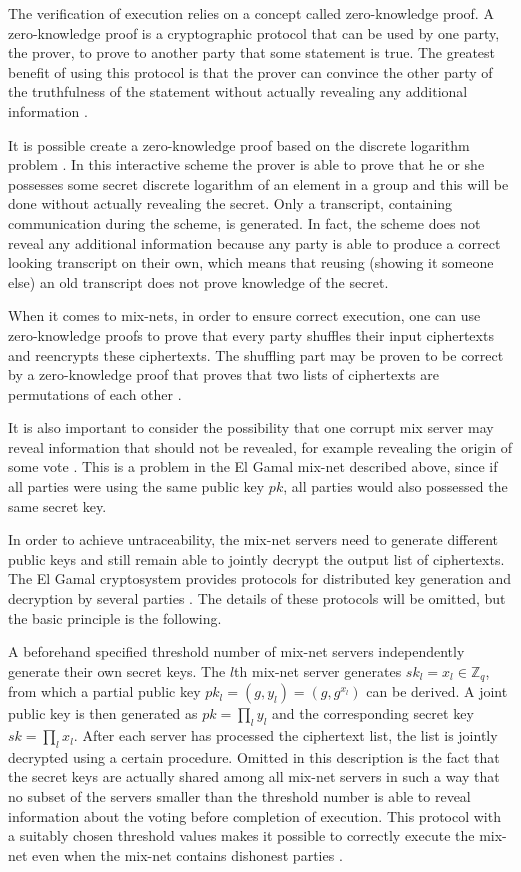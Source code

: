 The verification of execution relies on a concept called
zero-knowledge proof. A zero-knowledge proof is a cryptographic
protocol that can be used by one party, the prover, to prove to
another party that some statement is true. The greatest benefit of
using this protocol is that the prover can convince the other party of
the truthfulness of the statement without actually revealing any
additional information \cite{shoup}.

It is possible create a zero-knowledge proof based on the discrete
logarithm problem \cite{shoup}. In this interactive scheme the prover
is able to prove that he or she possesses some secret discrete
logarithm of an element in a group and this will be done without
actually revealing the secret. Only a transcript, containing
communication during the scheme, is generated. In fact, the scheme
does not reveal any additional information because any party is able
to produce a correct looking transcript on their own, which means that
reusing (showing it someone else) an old transcript does not prove
knowledge of the secret.

When it comes to mix-nets, in order to ensure correct execution, one
can use zero-knowledge proofs to prove that every party shuffles their
input ciphertexts and reencrypts these ciphertexts. The shuffling part
may be proven to be correct by a zero-knowledge proof that proves that
two lists of ciphertexts are permutations of each other
\cite{terelius}.

It is also important to consider the possibility that one corrupt mix
server may reveal information that should not be revealed, for example
revealing the origin of some vote \cite{electronicvoting}. This is a
problem in the El Gamal mix-net described above, since if all parties
were using the same public key $pk$, all parties would also possessed
the same secret key.

In order to achieve untraceability, the mix-net servers need to
generate different public keys and still remain able to jointly
decrypt the output list of ciphertexts. The El Gamal cryptosystem
provides protocols for distributed key generation and decryption by
several parties \cite{wikstrom1}. The details of these protocols will
be omitted, but the basic principle is the following.

A beforehand specified threshold number of mix-net servers
independently generate their own secret keys. The $l$th mix-net server
generates $sk_l = x_l \in \mathbb{Z}_q$, from which a partial public key
$pk_l = (g,y_l) = (g,g^{x_l})$ can be derived. A joint public key is
then generated as $pk = \prod_l y_l$ and the corresponding secret key
$sk = \prod_l x_l$. After each server has processed the ciphertext
list, the list is jointly decrypted using a certain procedure. Omitted
in this description is the fact that the secret keys are actually
shared among all mix-net servers in such a way that no subset of the
servers smaller than the threshold number is able to reveal
information about the voting before completion of execution. This
protocol with a suitably chosen threshold values makes it possible to
correctly execute the mix-net even when the mix-net contains dishonest
parties \cite{wikstrom1}.


